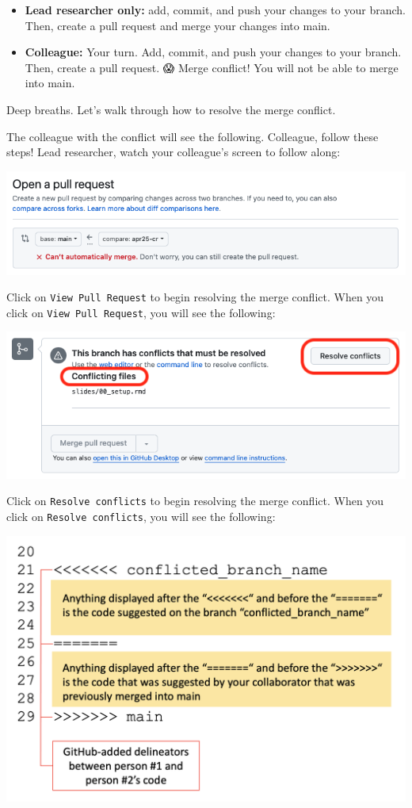 \documentclass[
]{book}
\providecommand{\tightlist}{%
  \setlength{\itemsep}{0pt}\setlength{\parskip}{0pt}}
\begin{document}
\begin{itemize}
\tightlist
\item
  \textbf{Lead researcher only:} add, commit, and push your changes to your branch.
  Then, create a pull request and merge your changes into main.
\end{itemize}

\begin{itemize}
\tightlist
\item
  \textbf{Colleague:} Your turn. Add, commit, and push your changes to your branch.
  Then, create a pull request. 😱 Merge conflict! You will not
  be able to merge into main.
\end{itemize}

Deep breaths. Let's walk through how to resolve the merge conflict.

The colleague with the conflict will see the following. Colleague, follow these steps!
Lead researcher, watch your colleague's screen to follow along:

\includegraphics[width=1\linewidth]{./figures/merge-conflict-1}

Click on \texttt{View\ Pull\ Request} to begin resolving the merge conflict. When you click on \texttt{View\ Pull\ Request}, you will see the following:

\includegraphics[width=1\linewidth]{./figures/merge-conflict-2}

Click on \texttt{Resolve\ conflicts} to begin resolving the merge conflict. When you click on \texttt{Resolve\ conflicts}, you will see the following:

\includegraphics[width=0.75\linewidth]{./figures/Example-merge-conflict-github}
\end{document}
